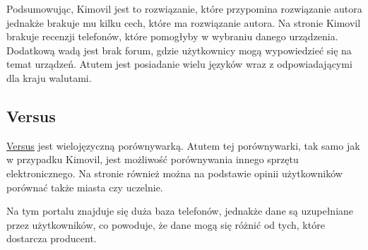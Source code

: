 Podsumowując, Kimovil jest to rozwiązanie, które przypomina rozwiązanie autora jednakże brakuje mu kilku cech, które ma rozwiązanie autora. Na stronie Kimovil brakuje recenzji telefonów, które pomogłyby w wybraniu danego urządzenia. Dodatkową wadą jest brak forum, gdzie użytkownicy mogą wypowiedzieć się na temat urządzeń. Atutem jest posiadanie wielu języków wraz z odpowiadającymi dla kraju walutami.

\subsection{Versus}
\href{https://versus.com/}{Versus} \cite{versus} jest wielojęzyczną porównywarką. Atutem tej porównywarki, tak samo jak w przypadku Kimovil, jest możliwość porównywania innego sprzętu elektronicznego. Na stronie również można na podstawie opinii użytkowników porównać także miasta czy uczelnie.

Na tym portalu znajduje się duża baza telefonów, jednakże dane są uzupełniane przez użytkowników, co powoduje, że dane mogą się różnić od tych, które dostarcza producent.

